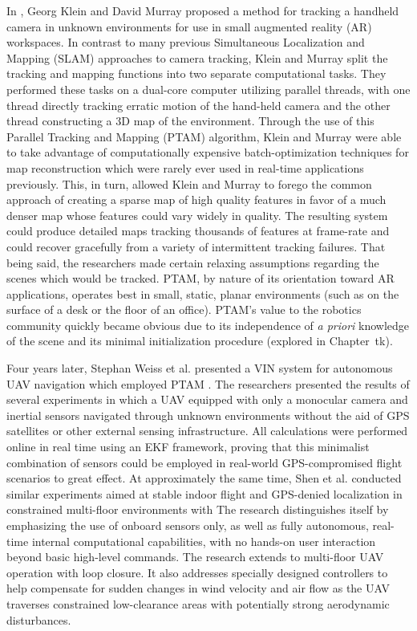 In \cite{Klein2007}, Georg Klein and David Murray proposed a method for tracking a handheld camera in unknown environments for use in small augmented reality (AR) workspaces. In contrast to many previous Simultaneous Localization and Mapping (SLAM) approaches to camera tracking, Klein and Murray split the tracking and mapping functions into two separate computational tasks. They performed these tasks on a dual-core computer utilizing parallel threads, with one thread directly tracking erratic motion of the hand-held camera and the other thread constructing a 3D map of the environment. Through the use of this Parallel Tracking and Mapping (PTAM) algorithm, Klein and Murray were able to take advantage of computationally expensive batch-optimization techniques for map reconstruction which were rarely ever used in real-time applications previously. This, in turn, allowed Klein and Murray to forego the common approach of creating a sparse map of high quality features in favor of a much denser map whose features could vary widely in quality. The resulting system could produce detailed maps tracking thousands of features at frame-rate and could recover gracefully from a variety of intermittent tracking failures. That being said, the researchers made certain relaxing assumptions regarding the scenes which would be tracked. PTAM, by nature of its orientation toward AR applications, operates best in small, static, planar environments (such as on the surface of a desk or the floor of an office). PTAM's value to the robotics community quickly became obvious due to its independence of \textit{a priori} knowledge of the scene and its minimal initialization procedure (explored in Chapter~tk). 

Four years later, Stephan Weiss et al. presented a VIN system for autonomous UAV navigation which employed PTAM \cite{Weiss2011}. The researchers presented the results of several experiments in which a UAV equipped with only a monocular camera and inertial sensors navigated through unknown environments without the aid of GPS satellites or other external sensing infrastructure. All calculations were performed online in real time using an EKF framework, proving that this minimalist combination of sensors could be employed in real-world GPS-compromised flight scenarios to great effect. At approximately the same time, Shen et al. \cite{Shen2011} conducted similar experiments aimed at stable indoor flight and GPS-denied localization in constrained multi-floor environments with  The research distinguishes itself by emphasizing the use of onboard sensors only, as well as fully autonomous, real-time internal computational capabilities, with no hands-on user interaction beyond basic high-level commands. The research extends to multi-floor UAV operation with loop closure. It also addresses specially designed controllers to help compensate for sudden changes in wind velocity and air flow as the UAV traverses constrained low-clearance areas with potentially strong aerodynamic disturbances.

